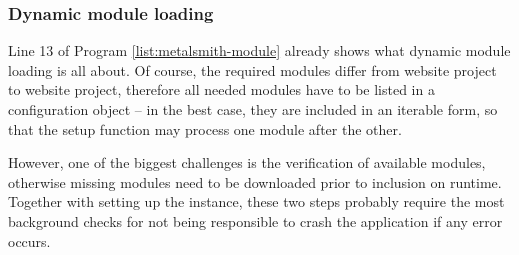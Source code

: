 \subsubsection{Dynamic module loading}
Line 13 of Program \ref{list:metalsmith-module} already shows what dynamic module loading is all about. Of course, the required modules differ from website project to website project, therefore all needed modules have to be listed in a configuration object -- in the best case, they are included in an iterable form, so that the setup function may process one module after the other.

However, one of the biggest challenges is the verification of available modules, otherwise missing modules need to be downloaded prior to inclusion on runtime. Together with setting up the instance, these two steps probably require the most background checks for not being responsible to crash the application if any error occurs.
